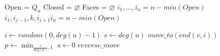 \begin{algorithmic}
    \State Open = $Q_{n}$
    \State Closed =  $\varnothing$
    \State Faces = $\varnothing$
      \State $i_{1}, ..., i_{n} = n-min( Open )$
	\State $i_{1}, i_{j-1}, k, i_{j+1} i_{n} = n-min( Open )$
      \EndFor
      \State $ $
    \EndWhile

    \State $i\gets random(0, deg(u)-1)$
    \State $s \gets deg(u)$
    \State $move\_to( end(v,i) )$
       \Else
    \State $p \gets \min_{ \frac{s}{deg(u)}, 1}$
      \State $s \gets 0$
    \Else
      \State $reverse\_move$
    \EndIf
      \EndIf
 \end{algorithmic}